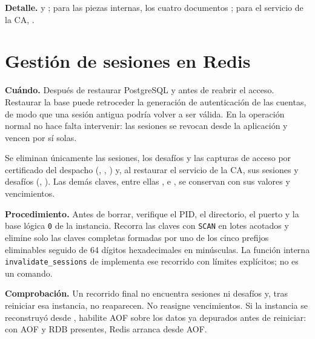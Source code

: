 
\textbf{Detalle.}  y
; para las piezas internas, los
cuatro documentos ; para el servicio de
la CA, .

\section{Gestión de sesiones en Redis}\label{sec:op-redis}

\textbf{Cuándo.} Después de restaurar PostgreSQL y antes de reabrir el acceso.
Restaurar la base puede retroceder la generación de autenticación de las
cuentas, de modo que una sesión antigua podría volver a ser válida. En la
operación normal no hace falta intervenir: las sesiones se revocan desde la
aplicación y vencen por sí solas.


Se eliminan únicamente las sesiones, los desafíos y las capturas de acceso
por certificado del despacho (,
, ) y, al
restaurar el servicio de la CA, sus sesiones y desafíos
(, ). Las
demás claves, entre ellas ,
 e ,
se conservan con sus valores y vencimientos.

\textbf{Procedimiento.} Antes de borrar, verifique el PID, el directorio, el
puerto y la base lógica \texttt{0} de la instancia. Recorra las claves con
\texttt{SCAN} en lotes acotados y elimine solo las claves completas formadas
por uno de los cinco prefijos eliminables seguido de 64 dígitos
hexadecimales en minúsculas. La función interna \texttt{invalidate\_sessions} de
 implementa ese recorrido con límites
explícitos; no es un comando.

\textbf{Comprobación.} Un recorrido final no encuentra sesiones ni desafíos
y, tras reiniciar esa instancia, no reaparecen. No reasigne vencimientos. Si
la instancia se reconstruyó desde , habilite AOF sobre los
datos ya depurados antes de reiniciar: con AOF y RDB presentes, Redis arranca
desde AOF.

